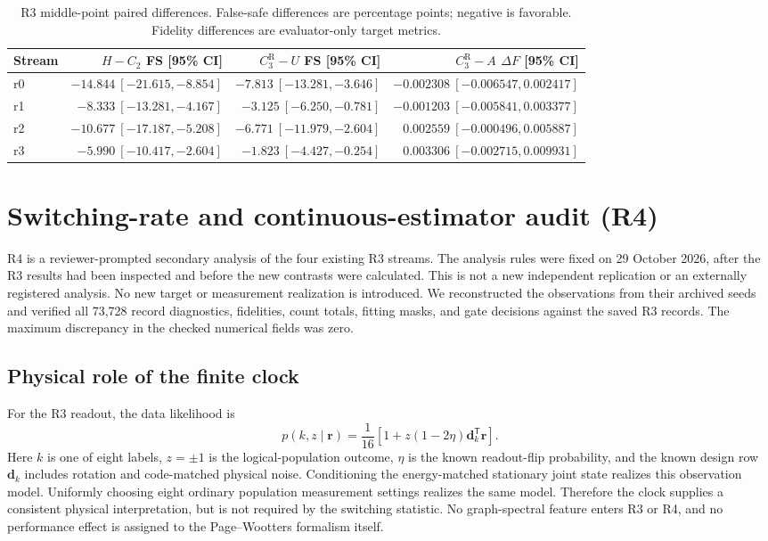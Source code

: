 \documentclass[11pt]{article}
\numberwithin{equation}{section}
\begin{document}
\begin{table}[ht]
\centering
\scriptsize
\setlength{\tabcolsep}{2pt}
\caption{R3 middle-point paired differences.  False-safe differences are
percentage points; negative is favorable.  Fidelity differences are evaluator-only
target metrics.}
\label{tab:r3-middle}
\begin{tabular}{@{}lrrr@{}}
\toprule
Stream & $H-C_2$ FS [95\% CI] & $C_3^{\mathrm R}-U$ FS [95\% CI]
& $C_3^{\mathrm R}-A$ $\Delta F$ [95\% CI] \\
\midrule
r0 & $-14.844\ [-21.615,-8.854]$ & $-7.813\ [-13.281,-3.646]$ & $-0.002308\ [-0.006547,0.002417]$ \\
r1 & $-8.333\ [-13.281,-4.167]$ & $-3.125\ [-6.250,-0.781]$ & $-0.001203\ [-0.005841,0.003377]$ \\
r2 & $-10.677\ [-17.187,-5.208]$ & $-6.771\ [-11.979,-2.604]$ & $0.002559\ [-0.000496,0.005887]$ \\
r3 & $-5.990\ [-10.417,-2.604]$ & $-1.823\ [-4.427,-0.254]$ & $0.003306\ [-0.002715,0.009931]$ \\
\bottomrule
\end{tabular}
\end{table}

\FloatBarrier
\section{Switching-rate and continuous-estimator audit (R4)}
\label{sec:supp-r4}

R4 is a reviewer-prompted secondary analysis of the four existing R3 streams.
The analysis rules were fixed on 29 October 2026, after the R3 results had
been inspected and before the new contrasts were calculated.  This is not a
new independent replication or an externally registered analysis.
No new target or measurement realization is introduced.  We reconstructed
the observations from their archived seeds and verified all 73,728 record
diagnostics, fidelities, count totals, fitting masks, and gate decisions
against the saved R3 records.  The maximum discrepancy in the checked
numerical fields was zero.

\subsection{Physical role of the finite clock}

For the R3 readout, the data likelihood is
\begin{equation}
p(k,z\mid\boldsymbol r)=\frac{1}{16}
\left[1+z(1-2\eta)\boldsymbol d_k^{\mathsf T}\boldsymbol r\right].
\end{equation}
Here $k$ is one of eight labels, $z=\pm1$ is the logical-population
outcome, $\eta$ is the known readout-flip probability, and the known
design row $\boldsymbol d_k$ includes rotation and code-matched physical
noise.  Conditioning the energy-matched stationary joint state realizes
this observation model.  Uniformly choosing eight ordinary population
measurement settings realizes the same model.  Therefore the clock supplies
a consistent physical interpretation, but is not required by the switching
statistic.  No graph-spectral feature enters R3 or R4, and no performance
effect is assigned to the Page--Wootters formalism itself.
\end{document}
